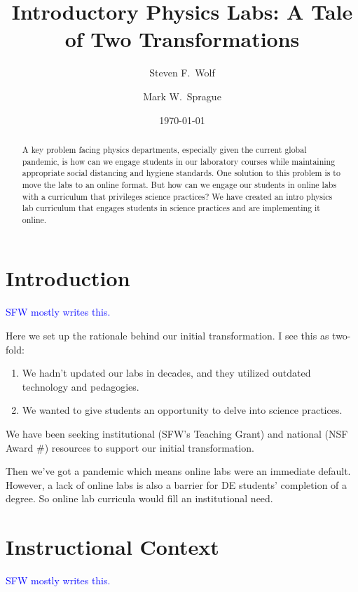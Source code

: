 \documentclass[aip, numerical, preprint]{revtex4-2}
\begin{document}
\title{Introductory Physics Labs:  A Tale of Two Transformations}

\author{Steven F.\ Wolf}
\author{Mark W.\ Sprague}

\date{\today}


\begin{abstract}
  A key problem facing physics departments, especially given the current global pandemic, is
  how can we engage students in our laboratory courses while maintaining appropriate social
  distancing and hygiene standards.  One solution to this problem is to move the labs to an
  online format.  But how can we engage our students in online labs with a curriculum that
  privileges science practices?  We have created an intro physics lab curriculum that engages
  students in science practices and are implementing it online.
\end{abstract}

\maketitle

\section{Introduction}
\textcolor{blue}{SFW mostly writes this.}

Here we set up the rationale behind our initial transformation.  I see this as two-fold:
\begin{enumerate}
  \item We hadn't updated our labs in decades, and they utilized outdated technology and
  pedagogies.
  \item We wanted to give students an opportunity to delve into science practices.
\end{enumerate}
We have been seeking institutional (SFW's Teaching Grant) and national (NSF Award \#) resources
to support our initial transformation.

Then we've got a pandemic which means online labs were an immediate default. However, a lack of
online labs is also a barrier for DE students' completion of a degree.  So online lab curricula
would fill an institutional need.

\section{Instructional Context}
\textcolor{blue}{SFW mostly writes this.}
\end{document}
